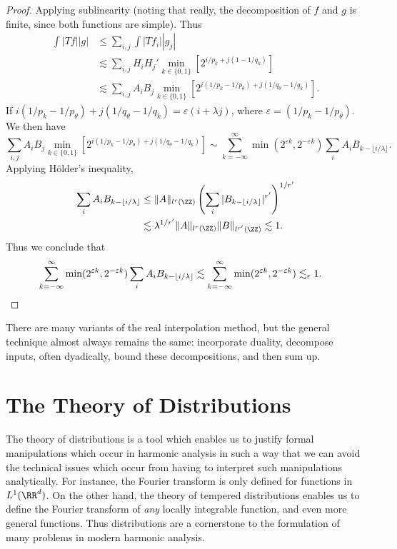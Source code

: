 \begin{proof}
  Applying sublinearity (noting that really, the decomposition of $f$ and $g$ is finite, since both functions are simple). Thus
  \begin{align*}
    \int |Tf| |g| &\leq \sum_{i,j} \int |Tf_i| |g_j|\\
    &\lesssim \sum_{i,j} H_i H_j' \min_{k \in \{0,1\}} \left[ 2^{i/p_k + j(1 - 1/q_k)} \right]\\
    &\lesssim \sum_{i,j} A_i B_j \min_{k \in \{ 0, 1 \}} \left[ 2^{i(1/p_k - 1/p_\theta) + j(1/q_\theta - 1/q_k)} \right].
  \end{align*}
  If $i(1/p_k - 1/p_\theta) + j(1/q_\theta - 1/q_k) = \varepsilon(i + \lambda j)$, where $\varepsilon = (1/p_k - 1/p_\theta)$. We then have
  \[ \sum_{i,j} A_i B_j \min_{k \in \{ 0, 1 \}} \left[ 2^{i(1/p_k - 1/p_\theta) + j(1/q_\theta - 1/q_k)} \right] \sim \sum_{k = -\infty}^\infty \min(2^{\varepsilon k}, 2^{-\varepsilon k}) \sum_i A_i B_{k - \lfloor i/\lambda \rfloor}. \]
  Applying H\"{o}lder's inequality,
  \begin{align*}
    \sum_i A_i B_{k - \lfloor i/\lambda \rfloor} &\leq \| A \|_{l^r(\ZZ)} \left( \sum_i |B_{k - \lfloor i/\lambda \rfloor}|^{r'} \right)^{1/r'}\\
    &\lesssim \lambda^{1/r'} \| A \|_{l^r(\ZZ)} \| B \|_{l^{r'}(\ZZ)} \lesssim 1.
  \end{align*}
  Thus we conclude that
  \begin{align*}
    \sum_{k = -\infty}^\infty \min(2^{\varepsilon k}, 2^{-\varepsilon k}) \sum_i A_i B_{k - \lfloor i/\lambda \rfloor} &\lesssim \sum_{k = -\infty}^\infty \min(2^{\varepsilon k}, 2^{-\varepsilon k}) \lesssim_\varepsilon 1. \qedhere
  \end{align*}
\end{proof}

There are many variants of the real interpolation method, but the general technique almost always remains the same: incorporate duality, decompose inputs, often dyadically, bound these decompositions, and then sum up.









\chapter{The Theory of Distributions}

The theory of distributions is a tool which enables us to justify formal manipulations which occur in harmonic analysis in such a way that we can avoid the technical issues which occur from having to interpret such manipulations analytically. For instance, the Fourier transform is only defined for functions in $L^1(\RR^d)$. On the other hand, the theory of tempered distributions enables us to define the Fourier transform of \emph{any} locally integrable function, and even more general functions. Thus distributions are a cornerstone to the formulation of many problems in modern harmonic analysis.

